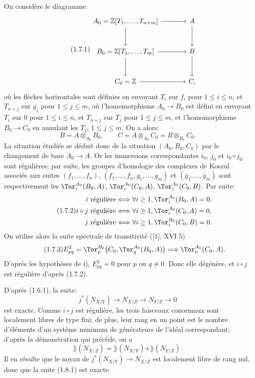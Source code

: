 On considère le diagramme:
\begin{equation}\tag{1.7.1}
\begin{tikzcd}[column sep=large,row sep=large]
A_0=\mathbb Z[T_1,\ldots,T_{n+m}] \arrow[r] \arrow[d] & A \arrow[d]\\
B_0=\mathbb Z[T_1,\ldots,T_m] \arrow[r] \arrow[d] & B \arrow[d]\\
C_0=\mathbb Z \arrow[r] & C,
\end{tikzcd}
\end{equation}
où les
flèches horizontales sont définies en envoyant $T_i$ sur $f_i$ pour $1\leq i\leq n$, et $T_{n+j}$ sur $g_j$ pour $1\leq j\leq m$, où l'homomorphisme $A_0\longrightarrow B_0$ est défini en envoyant $T_i$ sur $0$ pour $1\leq i\leq n$, et $T_{n+j}$ sur $T_j$ pour $1\leq j\leq m$, et l'homomorphisme $B_0\longrightarrow C_0$ en annulant les $T_j$, $1\leq j\leq m$. On a alors:
\[
 B=A\otimes_{A_0}B_0,
 \qquad
 C=A\otimes_{A_0}C_0=B\otimes_{B_0}C_0.
\]
La situation étudiée se déduit donc de la situation $(A_0,B_0,C_0)$ par le changement de base $A_0\longrightarrow A$. Or les immersions correspondantes $i_0$, $j_0$ et $i_0\circ j_0$ sont régulières; par suite, les groupes d'homologie des complexes de Koszul associés aux suites $(f_1,\ldots,f_n)$, $(f_1,\ldots,f_n,g_1,\ldots,g_m)$ et $(\bar g_1,\ldots,\bar g_m)$ sont respectivement les $\Tor_i^{A_0}(B_0,A)$, $\Tor_i^{A_0}(C_0,A)$, $\Tor_i^{A_0}(C_0,B)$. Par suite:
\begin{equation}\tag{1.7.2}
\begin{aligned}
 i\ \text{régulière} &\Longleftrightarrow \forall i\geq1,
 \Tor_i^{A_0}(B_0,A)=0,\\
 i\circ j\ \text{régulière} &\Longleftrightarrow \forall i\geq1,
 \Tor_i^{A_0}(C_0,A)=0,\\
 j\ \text{régulière} &\Longleftrightarrow \forall i\geq1,
 \Tor_i^{B_0}(C_0,B)=0.
\end{aligned}
\end{equation}
On utilise alors la suite spectrale de transitivité ([1], XVI 5)
\begin{equation}\tag{1.7.3}
E^2_{pq}=\Tor_p^{B_0}\bigl(C_0,\Tor_q^{A_0}(B_0,A)\bigr)
\Longrightarrow \Tor_n^{A_0}(C_0,A).
\end{equation}
D'après les hypothèses de i), $E^2_{pq}=0$ pour $p$ ou $q\ne0$. Donc elle dégénère, et $i\circ j$ est régulière d'après (1.7.2).

D'après (1.6.1), la suite:
\[
 j^*(N_{X/Y})\longrightarrow N_{X/Z}\longrightarrow N_{Y/Z}\longrightarrow0
\]
est exacte. Comme $i\circ j$ est régulière, les trois faisceaux conormaux sont localement libres de type fini; de plus, leur rang en un point est le
nombre d'éléments d'un système minimum de générateurs de l'idéal correspondant; d'après la démonstration qui précède, on a
\[
 \rang(N_{X/Z})=\rang(N_{X/Y})+\rang(N_{Y/Z}).
\]
Il en résulte que le noyau de $j^*(N_{X/Y})\longrightarrow N_{X/Z}$ est localement libre de rang nul, donc que la suite (1.8.1) est exacte.

